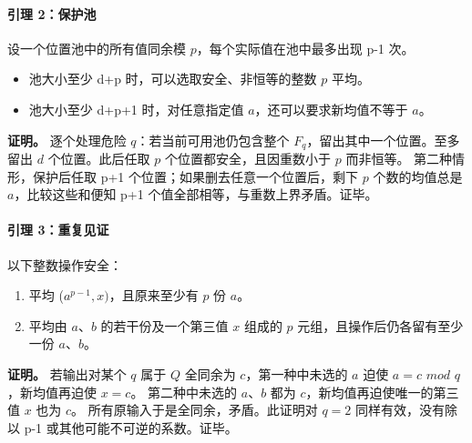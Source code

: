 \paragraph*{\texorpdfstring{{引理} {2：保护池}}{引理 2：保护池}}\label{C1-h3}

{设一个位置池中的所有值同余模} {\ensuremath{p}，每个实际值在池中最多出现} {p-1} {次。}

\begin{itemize}
\tightlist
\item
  {池大小至少} {d+p} {时，可以选取安全、非恒等的整数} {\ensuremath{p}} {平均。}
\item
  {池大小至少} {d+p+1} {时，对任意指定值} {\ensuremath{a}，还可以要求新均值不等于} {\ensuremath{a}。}
\end{itemize}

\textbf{{证明。}} {逐个处理危险} {\ensuremath{q}：若当前可用池仍包含整个} {\ensuremath{F_{q}}，留出其中一个位置。至多留出} {\ensuremath{d}} {个位置。此后任取} {\ensuremath{p}} {个位置都安全，且因重数小于} {\ensuremath{p}} {而非恒等。} {第二种情形，保护后任取} {p+1} {个位置；如果删去任意一个位置后，剩下} {\ensuremath{p}} {个数的均值总是} {\ensuremath{a}，比较这些和便知} {p+1} {个值全部相等，与重数上界矛盾。证毕。}

\paragraph*{\texorpdfstring{{引理} {3：重复见证}}{引理 3：重复见证}}\label{C1-h4}

{以下整数操作安全：}

\begin{enumerate}
\def\labelenumi{\arabic{enumi}.}
\tightlist
\item
  {平均} {(\ensuremath{a^{p-1},x)}，且原来至少有} {\ensuremath{p}} {份} {\ensuremath{a}。}
\item
  {平均由} {\ensuremath{a}、\ensuremath{b}} {的若干份及一个第三值} {\ensuremath{x}} {组成的} {\ensuremath{p}} {元组，且操作后仍各留有至少一份} {\ensuremath{a}、\ensuremath{b}。}
\end{enumerate}

\textbf{{证明。}} {若输出对某个} {\ensuremath{q}} {属于} {\ensuremath{Q}} {全同余为} {\ensuremath{c}，第一种中未选的} {\ensuremath{a}} {迫使} {\ensuremath{a=c}} {\ensuremath{mod}} {\ensuremath{q}，新均值再迫使} {\ensuremath{x=c}。} {第二种中未选的} {\ensuremath{a}、\ensuremath{b}} {都为} {\ensuremath{c}，新均值再迫使唯一的第三值} {\ensuremath{x}} {也为} {\ensuremath{c}。} {所有原输入于是全同余，矛盾。此证明对} {\ensuremath{q=2}} {同样有效，没有除以} {p-1} {或其他可能不可逆的系数。证毕。}

